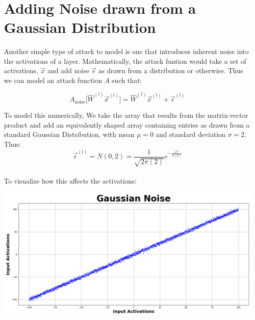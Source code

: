 \documentclass[12pt,letterpaper]{article}
\begin{document}
\section*{Adding Noise drawn from a Gaussian Distribution}

\paragraph*{}Another simple type of attack to model is one that introduces inherent noise into the activations of a layer. Mathematically, the attack funtion would take a set of activations, $\vec{x}$ and add noise $\vec{\epsilon}$ as drawn from a distribution or otherwise. Thus we can model an attack function $A$ such that:

\begin{equation}
\label{noise attack}
A_{\text{noise}} \big[ \hat{W}^{(l)} \vec{x}^{(l)} \big] = \hat{W}^{(l)} \vec{x}^{(l)} + \vec{\epsilon}^{(l)}
\end{equation}

To model this numerically, We take the array that results from the matrix-vector product and add an equivalently shaped array containing entries as drawn from a standard Gaussian Distribution, with mean $\mu = 0$ and standard deviation $\sigma = 2$. Thus:
\begin{equation}
\vec{\epsilon}^{(l)} = N(0,2) = \frac{1}{\sqrt{2\pi(2)}} e^{-\frac{x^2}{2(2)}}
\end{equation}
\paragraph*{}To visualize how this affects the activations:
\begin{center}
\includegraphics[scale=0.3]{Gaussian_Noise}
\end{center}


\end{document}
